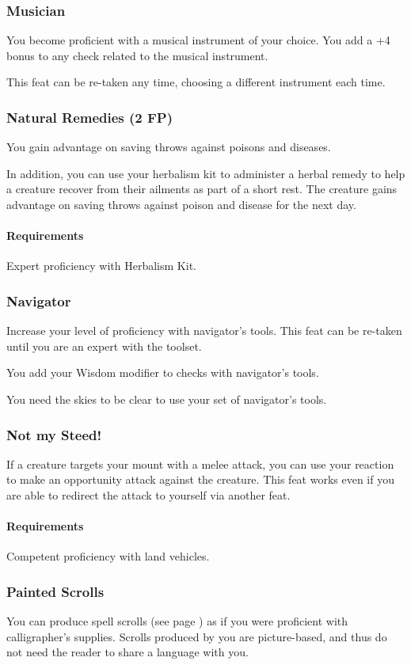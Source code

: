 \subsubsection{Musician} \label{feat::musician}
    You become proficient with a musical instrument of your choice.
    You add a +4 bonus to any check related to the musical instrument.

    This feat can be re-taken any time, choosing a different instrument each time.
\subsubsection{Natural Remedies (2 FP)} \label{feat::naturalremedies}
    You gain advantage on saving throws against poisons and diseases.

    In addition, you can use your herbalism kit to administer a herbal remedy to help a creature recover from their ailments as part of a short rest.
    The creature gains advantage on saving throws against poison and disease for the next day.
    \paragraph{Requirements} Expert proficiency with Herbalism Kit.
\subsubsection{Navigator} \label{feat::navigator}
    Increase your level of proficiency with navigator's tools.
    This feat can be re-taken until you are an expert with the toolset.

    You add your Wisdom modifier to checks with navigator's tools.

    You need the skies to be clear to use your set of navigator's tools.
\subsubsection{Not my Steed!} \label{feat::notmysteed}
    If a creature targets your mount with a melee attack, you can use your reaction to make an opportunity attack against the creature.
    This feat works even if you are able to redirect the attack to yourself via another feat.
    \paragraph{Requirements} Competent proficiency with land vehicles.
\subsubsection{Painted Scrolls} \label{feat::paintedscrolls}
    You can produce spell scrolls (see page \pageref{item::spellscroll}) as if you were proficient with calligrapher's supplies.
    Scrolls produced by you are picture-based, and thus do not need the reader to share a language with you.
